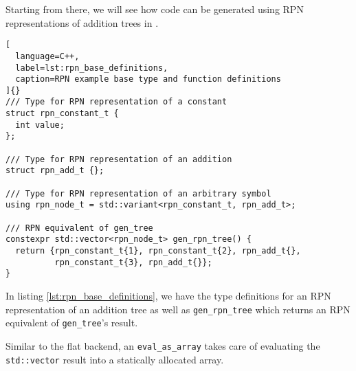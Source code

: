 \documentclass[../main]{subfiles}
\begin{document}
Starting from there, we will see how code can be generated using
RPN representations of addition trees in \cpp.

\begin{lstlisting}[
  language=C++,
  label=lst:rpn_base_definitions,
  caption=RPN example base type and function definitions
]{}
/// Type for RPN representation of a constant
struct rpn_constant_t {
  int value;
};

/// Type for RPN representation of an addition
struct rpn_add_t {};

/// Type for RPN representation of an arbitrary symbol
using rpn_node_t = std::variant<rpn_constant_t, rpn_add_t>;

/// RPN equivalent of gen_tree
constexpr std::vector<rpn_node_t> gen_rpn_tree() {
  return {rpn_constant_t{1}, rpn_constant_t{2}, rpn_add_t{},
          rpn_constant_t{3}, rpn_add_t{}};
}
\end{lstlisting}

In listing \ref{lst:rpn_base_definitions}, we have the type definitions for an
RPN representation of an addition tree as well as \lstinline{gen_rpn_tree} which
returns an RPN equivalent of \lstinline{gen_tree}'s result.

Similar to the flat backend, an \lstinline{eval_as_array} takes care
of evaluating the \lstinline{std::vector} result into a statically
allocated array.
\end{document}
